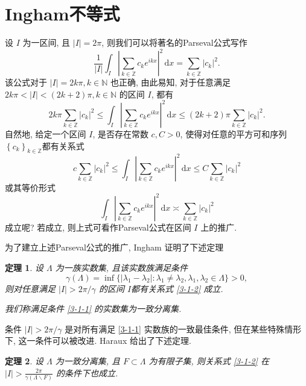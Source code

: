\documentclass[master]{cugthesis}
\newcommand\N{\ensuremath{\mathbb{N}}}
\newcommand\Z{\ensuremath{\mathbb{Z}}}
\renewcommand\d{\ensuremath{\,\mathrm{d}}}
\newtheorem{theorem}{定理}[chapter]
\begin{document}
    \section{Ingham不等式}
    设 $I$ 为一区间, 且 $|I|=2\pi$, 则我们可以将著名的Parseval公式写作
    \begin{equation*}
        \frac{1}{|I|} \int_I \left| \sum_{k\in \Z} c_k e^{ikx}\right|^2 \d x = \sum_{k\in \Z} |c_k|^2.
    \end{equation*}
    该公式对于 $|I|=2k\pi, k\in \N$ 也正确, 由此易知, 对于任意满足 $2k\pi <|I|<(2k+2)\pi,k\in\N$ 的区间 $I$, 都有
    \begin{equation*}
        2k\pi \sum_{k\in \Z}|c_k|^2 \le \int _I \left| \sum_{k\in \Z}c_ke^{ikx} \right|^2\d x \le (2k+2)\pi  \sum_{k\in\Z }|c_k|^2. 
    \end{equation*}
    自然地, 给定一个区间 $I$, 是否存在常数 $c,C>0$, 使得对任意的平方可和序列 $\left\{c_k\right\}_{k\in \Z}$都有关系式
    \begin{equation}
        c \sum_{k\in \Z} |c_k|^2 \le \int _I \left| \sum_{k\in \Z} c_k e^{ikx} \right|^2 \d x \le C \sum_{k\in \Z}|c_k|^2
    \end{equation}
    或其等价形式
    \begin{equation}\label{3-1-2}
        \int _I \left| \sum_{k\in \Z} c_k e^{ikx} \right|^2 \d x\asymp \sum_{k\in \Z}|c_k|^2
    \end{equation}
    成立呢? 若成立, 则上式可看作Parseval公式在区间 $I$ 上的推广. 
    
    为了建立上述Parseval公式的推广, Ingham \cite{Ingham1936} 证明了下述定理
    \begin{theorem}\label{thm-ingham}
    设 $\Lambda$ 为一族实数集, 且该实数族满足条件
    \begin{equation}\label{3-1-1}
        \gamma(\Lambda)=\inf\lbrace |\lambda_1-\lambda_2|: \lambda_1\neq \lambda_2, \lambda_1,\lambda_2\in \Lambda\rbrace>0,
    \end{equation}
     则对任意满足 $|I|>2\pi /\gamma$ 的区间 $I$都有关系式 \eqref{3-1-2} 成立.

我们称满足条件 \eqref{3-1-1} 的实数集为一致分离集.
    \end{theorem}
    
    条件 $|I|> 2\pi /\gamma$ 是对所有满足 \eqref{3-1-1} 实数族的一致最佳条件, 但在某些特殊情形下, 这一条件可以被改进. Haraux \cite{Haraux1989} 给出了下述定理.
    
    \begin{theorem}\label{thm-haraux}
    设 $\Lambda$ 为一致分离集, 且 $F\subset \Lambda$ 为有限子集, 则关系式 \eqref{3-1-2} 在 $|I|> \frac{2\pi}{\gamma(\Lambda \backslash F)}$ 的条件下也成立.
    \end{theorem}
    
\end{document}
